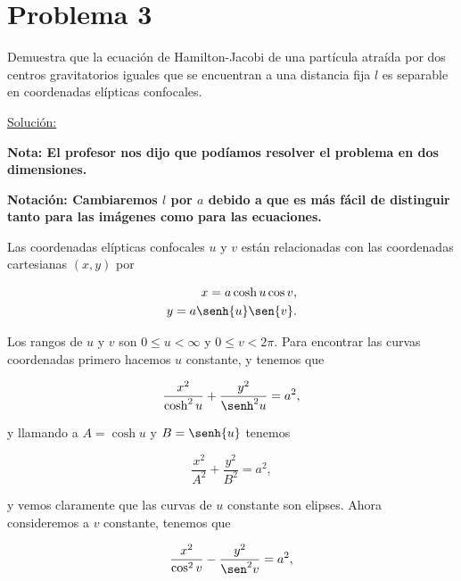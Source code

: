 \documentclass[a4paper,10pt]{article}
\numberwithin{equation}{section}
\begin{document}
\section{Problema 3}

Demuestra que la ecuación de Hamilton-Jacobi de una partícula atraída por dos centros
gravitatorios iguales que se encuentran a una distancia fija $l$ es separable en coordenadas 
elípticas confocales. 

\vspace{.3cm}

\underline{Solución:} \vspace{.3cm}

\textbf{Nota: El profesor nos dijo que podíamos resolver el problema en dos dimensiones.}

\vspace{.3cm}

\textbf{Notación: Cambiaremos $l$ por $a$ debido a que es más fácil de distinguir tanto 
para las imágenes como para las ecuaciones.}

\vspace{.3cm}

Las coordenadas elípticas confocales $u$ y $v$ están relacionadas con las coordenadas 
cartesianas $(x,y)$ por 

\begin{align}
 x = a\cosh{u}\cos{v}, \\
 y = a\senh{u}\sen{v}.
\end{align}

Los rangos de $u$ y $v$ son $0 \leq u < \infty$ y $0 \leq v < 2\pi$. Para encontrar
las curvas coordenadas primero hacemos $u$ constante, y tenemos que 

\begin{equation}
 \frac{x^2}{\cosh^2{u}} + \frac{y^2}{\senh^2{u}} = a^2,
 \label{eq:uelipse}
\end{equation}

y llamando a $A = \cosh{u}$ y $B = \senh{u}$ tenemos 

\begin{equation}
 \frac{x^2}{A^2} + \frac{y^2}{B^2} = a^2,
\end{equation}

y vemos claramente que las curvas de $u$ constante son elipses. Ahora consideremos 
a $v$ constante, tenemos que 

\begin{equation}
 \frac{x^2}{\cos^2{v}} - \frac{y^2}{\sen^2{v}} = a^2,
 \label{eq:vhiperbola}
\end{equation}
\end{document}

